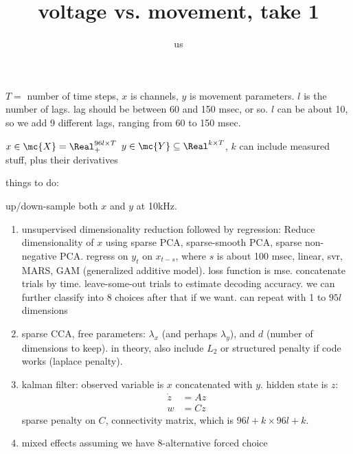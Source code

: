  

\title{voltage vs. movement, take 1}

\author{us}



\maketitle
% 

$T=$ number of time steps, $x$ is channels, $y$ is movement parameters. $l$ is the number of lags. lag should be between 60 and 150 msec, or so.  $l$ can be about 10, so we add 9 different lags, ranging from 60 to 150 msec.

$x \in \mc{X} =\Real_+^{96l \times T}$
$y \in \mc{Y} \subseteq \Real^{k \times T}$, $k$ can include measured stuff, plus their derivatives

things to do:

up/down-sample both $x$ and $y$ at 10kHz.

\begin{enumerate}
	\item unsupervised dimensionality reduction followed by regression: Reduce dimensionality of $x$ using sparse PCA, sparse-smooth PCA, sparse non-negative PCA.  regress on $y_t$ on $x_{t-s}$, where $s$ is about 100 msec, linear, svr, MARS, GAM (generalized additive model). loss function is mse.  concatenate trials by time. leave-some-out trials to estimate decoding accuracy.  we can further classify into 8 choices after that if we want. can repeat with 1 to $95l$ dimensions
	\item sparse CCA, free parameters: $\lambda_x$ (and perhaps $\lambda_y$), and $d$ (number of dimensions to keep).  in theory, also include $L_2$ or structured penalty if code works (laplace penalty).
	\item kalman filter: observed variable is $x$ concatenated with $y$.  hidden state is $z$:
	\begin{align}
		\dot{z} &= A z \\
		w &= C z
	\end{align}
sparse penalty on $C$, connectivity matrix, which is $96l+k \times 96l+k$.  
	\item mixed effects assuming we have 8-alternative forced choice
\end{enumerate}


% 

% 


%

%


